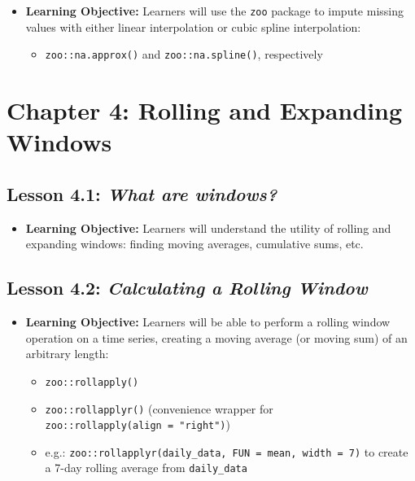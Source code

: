 \documentclass[
]{book}
\providecommand{\tightlist}{%
  \setlength{\itemsep}{0pt}\setlength{\parskip}{0pt}}
\begin{document}
\begin{itemize}
\tightlist
\item
  \textbf{Learning Objective:} Learners will use the \texttt{zoo} package to impute missing values with either linear interpolation or cubic spline interpolation:

  \begin{itemize}
  \tightlist
  \item
    \texttt{zoo::na.approx()} and \texttt{zoo::na.spline()}, respectively
  \end{itemize}
\end{itemize}

\hypertarget{chapter-4-rolling-and-expanding-windows}{%
\section*{Chapter 4: Rolling and Expanding Windows}\label{chapter-4-rolling-and-expanding-windows}}

\hypertarget{lesson-4.1-what-are-windows}{%
\subsection*{\texorpdfstring{Lesson 4.1: \emph{What are windows?}}{Lesson 4.1: What are windows?}}\label{lesson-4.1-what-are-windows}}

\begin{itemize}
\tightlist
\item
  \textbf{Learning Objective:} Learners will understand the utility of rolling and expanding windows: finding moving averages, cumulative sums, etc.
\end{itemize}

\hypertarget{lesson-4.2-calculating-a-rolling-window}{%
\subsection*{\texorpdfstring{Lesson 4.2: \emph{Calculating a Rolling Window}}{Lesson 4.2: Calculating a Rolling Window}}\label{lesson-4.2-calculating-a-rolling-window}}

\begin{itemize}
\tightlist
\item
  \textbf{Learning Objective:} Learners will be able to perform a rolling window operation on a time series, creating a moving average (or moving sum) of an arbitrary length:

  \begin{itemize}
  \tightlist
  \item
    \texttt{zoo::rollapply()}
  \item
    \texttt{zoo::rollapplyr()} (convenience wrapper for \texttt{zoo::rollapply(align\ =\ "right")})
  \item
    e.g.: \texttt{zoo::rollapplyr(daily\_data,\ FUN\ =\ mean,\ width\ =\ 7)} to create a 7-day rolling average from \texttt{daily\_data}
  \end{itemize}
\end{itemize}
\end{document}
